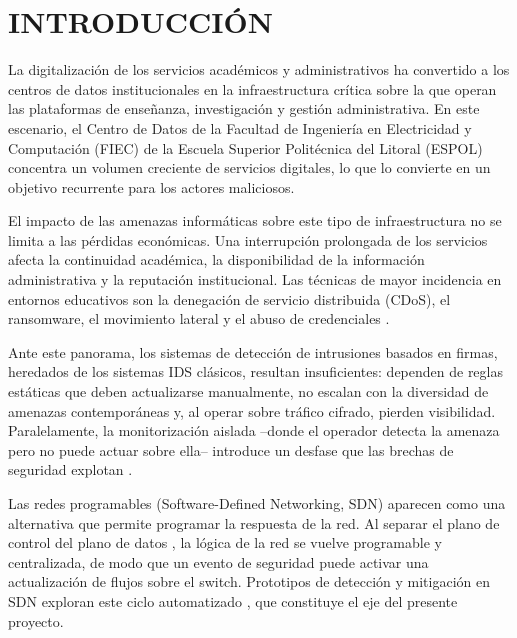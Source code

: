 \chapter{INTRODUCCI\'ON}
\thispagestyle{empty}
\label{chapter:introduction}

La digitalizaci\'on de los servicios acad\'emicos y administrativos ha convertido a los centros de datos institucionales en la infraestructura cr\'itica sobre la que operan las plataformas de ense\~nanza, investigaci\'on y gesti\'on administrativa. En este escenario, el Centro de Datos de la Facultad de Ingenier\'ia en Electricidad y Computaci\'on (FIEC) de la Escuela Superior Polit\'ecnica del Litoral (ESPOL) concentra un volumen creciente de servicios digitales, lo que lo convierte en un objetivo recurrente para los actores maliciosos.

El impacto de las amenazas inform\'aticas sobre este tipo de infraestructura no se limita a las p\'erdidas econ\'omicas. Una interrupci\'on prolongada de los servicios afecta la continuidad acad\'emica, la disponibilidad de la informaci\'on administrativa y la reputaci\'on institucional. Las t\'ecnicas de mayor incidencia en entornos educativos son la denegaci\'on de servicio distribuida (CDoS), el ransomware, el movimiento lateral y el abuso de credenciales \parencite{nist80061r2}.

Ante este panorama, los sistemas de detecci\'on de intrusiones basados en firmas, heredados de los sistemas IDS cl\'asicos, resultan insuficientes: dependen de reglas est\'aticas que deben actualizarse manualmente, no escalan con la diversidad de amenazas contempor\'aneas y, al operar sobre tr\'afico cifrado, pierden visibilidad. Paralelamente, la monitorizaci\'on aislada --donde el operador detecta la amenaza pero no puede actuar sobre ella-- introduce un desfase que las brechas de seguridad explotan \parencite{nistcsf20}.

Las redes programables (Software-Defined Networking, SDN) aparecen como una alternativa que permite programar la respuesta de la red. Al separar el plano de control del plano de datos \parencite{rfc7426}, la l\'ogica de la red se vuelve programable y centralizada, de modo que un evento de seguridad puede activar una actualizaci\'on de flujos sobre el switch. Prototipos de detecci\'on y mitigaci\'on en SDN exploran este ciclo automatizado \parencite{braga2010,shin2013}, que constituye el eje del presente proyecto.

